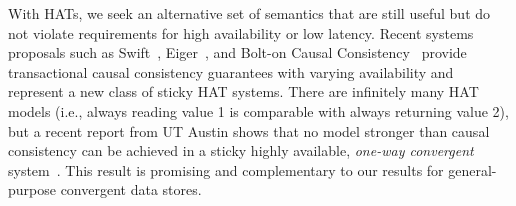 With HATs, we seek an alternative set of semantics that are still
useful but do not violate requirements for high availability or low
latency. Recent systems proposals such as Swift~\cite{swift},
Eiger~\cite{eiger}, and Bolt-on Causal Consistency~\cite{bolton}
provide transactional causal consistency guarantees with varying
availability and represent a new class of sticky HAT systems. There
are infinitely many HAT models (i.e., always reading value 1 is
comparable with always returning value 2), but a recent report from UT
Austin shows that no model stronger than causal consistency can be
achieved in a sticky highly available, \textit{one-way convergent}
system~\cite{cac}. This result is promising and complementary to our
results for general-purpose convergent data stores.






